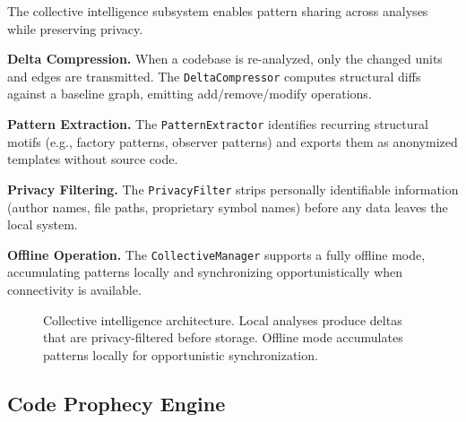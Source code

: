 \documentclass[10pt, twocolumn]{article}
\begin{document}
The collective intelligence subsystem enables pattern sharing across analyses while preserving privacy.

\textbf{Delta Compression.} When a codebase is re-analyzed, only the changed units and edges are transmitted. The \texttt{DeltaCompressor} computes structural diffs against a baseline graph, emitting add/remove/modify operations.

\textbf{Pattern Extraction.} The \texttt{PatternExtractor} identifies recurring structural motifs (e.g., factory patterns, observer patterns) and exports them as anonymized templates without source code.

\textbf{Privacy Filtering.} The \texttt{PrivacyFilter} strips personally identifiable information (author names, file paths, proprietary symbol names) before any data leaves the local system.

\textbf{Offline Operation.} The \texttt{CollectiveManager} supports a fully offline mode, accumulating patterns locally and synchronizing opportunistically when connectivity is available.

\begin{figure}[t]
\centering
{}
\caption{Collective intelligence architecture. Local analyses produce deltas that are privacy-filtered before storage. Offline mode accumulates patterns locally for opportunistic synchronization.}
\label{fig:collective}
\end{figure}


\subsection{Code Prophecy Engine}
\label{sec:prophecy}
\end{document}
